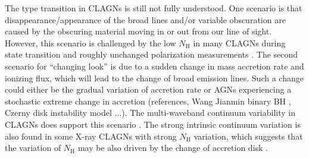\documentclass[linenumbers]{aastex631}
\begin{document}


The type transition in CLAGNs is still not fully understood. One scenario is that disappearance/appearance of the broad lines and/or variable obscuration are caused by the obscuring material moving in or out from our line of sight\citep[e.g.,][]{2013MNRAS.436.1615M,2014MNRAS.443.2862A,2015ApJ...815...55R,2018MNRAS.481.2470T,2019ApJ...887...15W}. However, this scenario is challenged by the low $N_\mathrm{H}$ in many CLAGNs during state transition \citep[e.g.,][]{2016A&A...593L...9H} and roughly unchanged polarization measurements \citep[e.g.,][]{2019sf2a.conf..509M}. The second scenario for ``changing look'' is due to a {\color{red}sudden} change in mass accretion rate and ionizing flux, which will lead to the change of broad emission lines. Such a change could either be {\color{red}the gradual variation of accretion rate or AGNs experiencing a stochastic extreme change in accretion (references, Wang Jianmin binary BH , Czerny disk instability model ...).} The multi-waveband continuum variability in CLAGNs does support this scenario \citep[e.g.,][]{2017ApJ...846L...7S,2018ApJ...864...27S,2018MNRAS.480.3898N}. The strong intrinsic continuum variation is also found in some X-ray CLAGNs with strong $N_\mathrm{H}$ variation, which suggests that the variation of $N_\mathrm{H}$ may be also driven by the change of accretion disk \citep[e.g., disk winds;][]{2021RAA....21..199L}.
\end{document}
